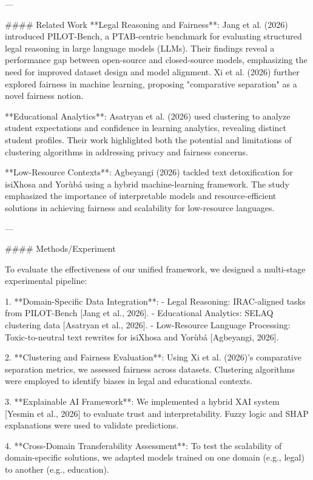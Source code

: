 ---

#### Related Work  
**Legal Reasoning and Fairness**: Jang et al. (2026) introduced PILOT-Bench, a PTAB-centric benchmark for evaluating structured legal reasoning in large language models (LLMs). Their findings reveal a performance gap between open-source and closed-source models, emphasizing the need for improved dataset design and model alignment. Xi et al. (2026) further explored fairness in machine learning, proposing "comparative separation" as a novel fairness notion.

**Educational Analytics**: Asatryan et al. (2026) used clustering to analyze student expectations and confidence in learning analytics, revealing distinct student profiles. Their work highlighted both the potential and limitations of clustering algorithms in addressing privacy and fairness concerns.

**Low-Resource Contexts**: Agbeyangi (2026) tackled text detoxification for isiXhosa and Yorùbá using a hybrid machine-learning framework. The study emphasized the importance of interpretable models and resource-efficient solutions in achieving fairness and scalability for low-resource languages.

---

#### Methods/Experiment  

To evaluate the effectiveness of our unified framework, we designed a multi-stage experimental pipeline:

1. **Domain-Specific Data Integration**:  
   - Legal Reasoning: IRAC-aligned tasks from PILOT-Bench [Jang et al., 2026].  
   - Educational Analytics: SELAQ clustering data [Asatryan et al., 2026].  
   - Low-Resource Language Processing: Toxic-to-neutral text rewrites for isiXhosa and Yorùbá [Agbeyangi, 2026].

2. **Clustering and Fairness Evaluation**:  
   Using Xi et al. (2026)'s comparative separation metrics, we assessed fairness across datasets. Clustering algorithms were employed to identify biases in legal and educational contexts.

3. **Explainable AI Framework**:  
   We implemented a hybrid XAI system [Yesmin et al., 2026] to evaluate trust and interpretability. Fuzzy logic and SHAP explanations were used to validate predictions.

4. **Cross-Domain Transferability Assessment**:  
   To test the scalability of domain-specific solutions, we adapted models trained on one domain (e.g., legal) to another (e.g., education).

